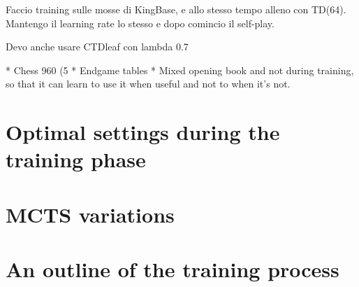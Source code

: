 Faccio training sulle mosse di KingBase, e allo stesso tempo alleno con TD(64).
Mantengo il learning rate lo stesso e dopo comincio il self-play.

Devo anche usare CTDleaf con lambda 0.7


* Chess 960 (5%
* Endgame tables
* Mixed opening book and not during training, so that it can learn to use it
  when useful and not to when it's not.

\section{Optimal settings during the training phase}
\section{\ac{MCTS} variations}
\section{An outline of the training process}
